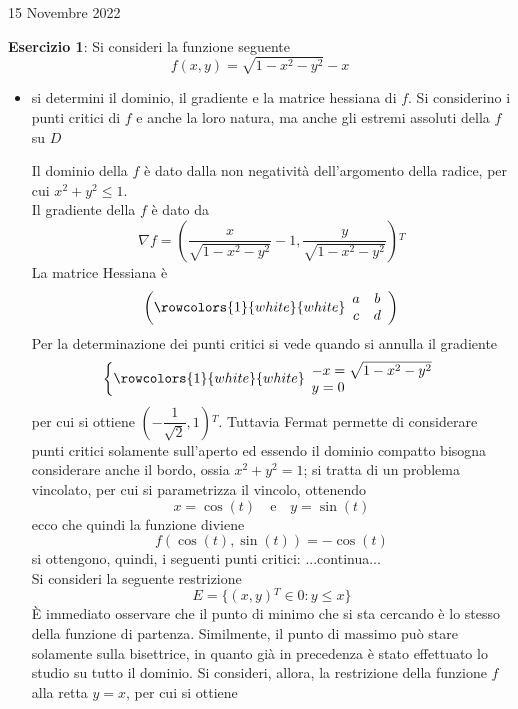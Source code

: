 \documentclass[a4paper]{extarticle}
\begin{document}
\newpage
\noindent
\begin{center}
    15 Novembre 2022
\end{center}
\textbf{Esercizio 1}: Si consideri la funzione seguente
\[f(x,y) = \sqrt{1-x^2-y^2}-x\]
\begin{itemize}
    \item si determini il dominio, il gradiente e la matrice hessiana di $f$. Si considerino i punti critici di $f$ e anche la loro natura, ma anche gli estremi assoluti della $f$ su $D$
    
    \vspace{1em}
    \noindent
    Il dominio della $f$ è dato dalla non negatività dell'argomento della radice, per cui $x^2+y^2 \leq 1$.\\
    Il gradiente della $f$ è dato da
    \[\nabla f = \left(\dfrac{x}{\sqrt{1-x^2-y^2}}-1, \dfrac{y}{\sqrt{1-x^2-y^2}}\right){^T}\]
    La matrice Hessiana è
    \[\left(
    \rowcolors{1}{white}{white}    
    \begin{array}{cc}
        a & b\\
        c & d
    \end{array}
    \right)\]
    Per la determinazione dei punti critici si vede quando si annulla il gradiente
    \[\left\{
    \rowcolors{1}{white}{white}    
    \begin{array}{ll}
        -x=\sqrt{1-x^2-y^2}\\
        y =0\\
    \end{array}
    \right.\]
    per cui si ottiene $\left(-\dfrac{1}{\sqrt{2}}, 1\right){^T}$. Tuttavia Fermat permette di considerare punti critici solamente sull'aperto ed essendo il dominio compatto bisogna considerare anche il bordo, ossia $x^2+y^2=1$; si tratta di un problema vincolato, per cui si parametrizza il vincolo, ottenendo
    \[x=\cos(t) \hspace{1em} \text{e} \hspace{1em} y=\sin(t)\]
    ecco che quindi la funzione diviene
    \[f(\cos(t),\sin(t))=-\cos(t)\]
    si ottengono, quindi, i seguenti punti critici: ...continua...\\
    Si consideri la seguente restrizione
    \[E = \{(x,y){^T} \in 0 : y \leq x\}\]
    È immediato osservare che il punto di minimo che si sta cercando è lo stesso della funzione di partenza. Similmente, il punto di massimo può stare solamente sulla bisettrice, in quanto già in precedenza è stato effettuato lo studio su tutto il dominio. Si consideri, allora, la restrizione della funzione $f$ alla retta $y=x$, per cui si ottiene

\end{itemize}
\end{document}
